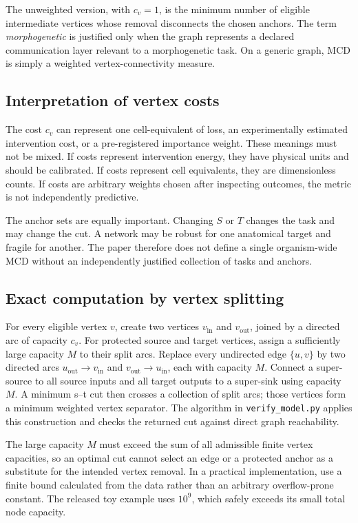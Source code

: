 \documentclass[12pt,a4paper]{article}
\newcommand{\MCD}{\mathrm{MCD}}
\begin{document}
The unweighted version, with \(c_v=1\), is the minimum number of eligible intermediate vertices whose removal disconnects the chosen anchors. The term \emph{morphogenetic} is justified only when the graph represents a declared communication layer relevant to a morphogenetic task. On a generic graph, \(\MCD\) is simply a weighted vertex-connectivity measure.

\subsection{Interpretation of vertex costs}
The cost \(c_v\) can represent one cell-equivalent of loss, an experimentally estimated intervention cost, or a pre-registered importance weight. These meanings must not be mixed. If costs represent intervention energy, they have physical units and should be calibrated. If costs represent cell equivalents, they are dimensionless counts. If costs are arbitrary weights chosen after inspecting outcomes, the metric is not independently predictive.

The anchor sets are equally important. Changing \(S\) or \(T\) changes the task and may change the cut. A network may be robust for one anatomical target and fragile for another. The paper therefore does not define a single organism-wide MCD without an independently justified collection of tasks and anchors.

\subsection{Exact computation by vertex splitting}
For every eligible vertex \(v\), create two vertices \(v_{\mathrm{in}}\) and \(v_{\mathrm{out}}\), joined by a directed arc of capacity \(c_v\). For protected source and target vertices, assign a sufficiently large capacity \(M\) to their split arcs. Replace every undirected edge \(\{u,v\}\) by two directed arcs \(u_{\mathrm{out}}\to v_{\mathrm{in}}\) and \(v_{\mathrm{out}}\to u_{\mathrm{in}}\), each with capacity \(M\). Connect a super-source to all source inputs and all target outputs to a super-sink using capacity \(M\). A minimum s--t cut then crosses a collection of split arcs; those vertices form a minimum weighted vertex separator. The algorithm in \texttt{verify\_model.py} applies this construction and checks the returned cut against direct graph reachability.

The large capacity \(M\) must exceed the sum of all admissible finite vertex capacities, so an optimal cut cannot select an edge or a protected anchor as a substitute for the intended vertex removal. In a practical implementation, use a finite bound calculated from the data rather than an arbitrary overflow-prone constant. The released toy example uses \(10^9\), which safely exceeds its small total node capacity.
\end{document}
